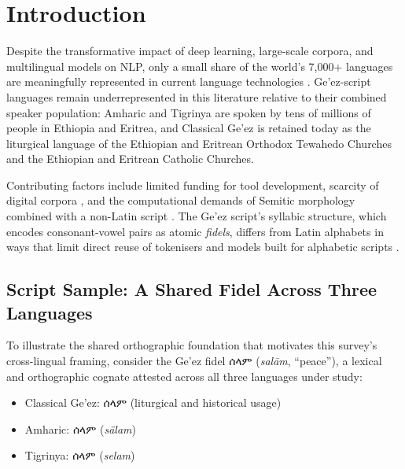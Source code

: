 \documentclass[sn-mathphys-num]{sn-jnl}
\newcommand{\geez}[1]{{\geezfont #1}}
\theoremstyle{thmstyleone}
\theoremstyle{thmstyletwo}
\theoremstyle{thmstylethree}
\begin{document}
\maketitle

\section{Introduction}\label{sec:intro}

Despite the transformative impact of deep learning, large-scale corpora, and multilingual models on NLP, only a small share of the world's 7,000+ languages are meaningfully represented in current language technologies \citep{joshi_state_2020}. Ge'ez-script languages remain underrepresented in this literature relative to their combined speaker population: Amharic and Tigrinya are spoken by tens of millions of people in Ethiopia and Eritrea, and Classical Ge'ez is retained today as the liturgical language of the Ethiopian and Eritrean Orthodox Tewahedo Churches and the Ethiopian and Eritrean Catholic Churches.

Contributing factors include limited funding for tool development, scarcity of digital corpora \citep{tonja_natural_2023}, and the computational demands of Semitic morphology combined with a non-Latin script \citep{teklehaymanot_movoc_2025}. The Ge'ez script's syllabic structure, which encodes consonant-vowel pairs as atomic \emph{fidels}, differs from Latin alphabets in ways that limit direct reuse of tokenisers and models built for alphabetic scripts \citep{teklehaymanot_tokenization_2025}.

\subsection*{Script Sample: A Shared Fidel Across Three Languages}

To illustrate the shared orthographic foundation that motivates this survey's cross-lingual framing, consider the Ge'ez fidel \geez{ሰላም} (\emph{sal\={a}m}, ``peace''), a lexical and orthographic cognate attested across all three languages under study:

\begin{itemize}
    \item Classical Ge'ez: \geez{ሰላም} (liturgical and historical usage)
    \item Amharic: \geez{ሰላም} (\emph{sälam})
    \item Tigrinya: \geez{ሰላም} (\emph{selam})
\end{itemize}
\end{document}
